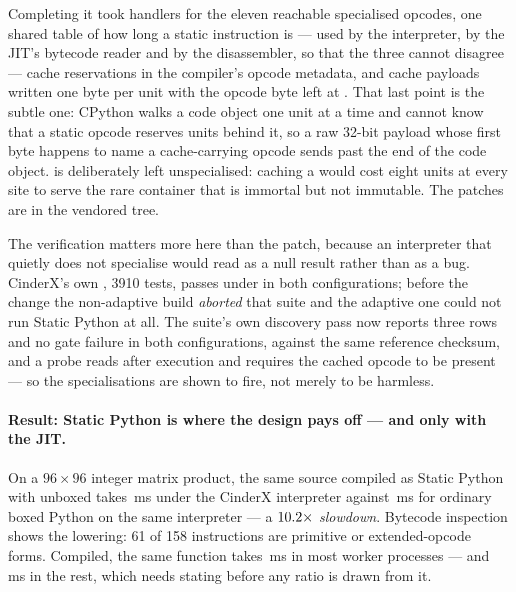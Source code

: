 Completing it took handlers for the eleven reachable specialised opcodes, one shared table of
how long a static instruction is --- used by the interpreter, by the JIT's bytecode reader and
by the disassembler, so that the three cannot disagree --- cache reservations in the compiler's
opcode metadata, and cache payloads written one byte per unit with the opcode byte left at
. That last point is the subtle one: CPython walks a code object one unit at a time
and cannot know that a static opcode reserves units behind it, so a raw 32-bit payload whose
first byte happens to name a cache-carrying opcode sends  past the end of the
code object.  is deliberately left unspecialised: caching a
 would cost eight units at every  site to serve the
rare container that is immortal but not immutable. The patches are in the vendored tree.

The verification matters more here than the patch, because an interpreter that quietly does not
specialise would read as a null result rather than as a bug. CinderX's own
, 3910 tests, passes under  in both
configurations; before the change the non-adaptive build \emph{aborted} that suite and the
adaptive one could not run Static Python at all. The suite's own discovery pass now reports
three rows and no gate failure in both configurations, against the same reference checksum, and
a probe reads  after execution and requires the cached opcode to be
present --- so the specialisations are shown to fire, not merely to be harmless.

\paragraph{Result: Static Python is where the design pays off --- and only with the JIT.}
On a $96{\times}96$ integer matrix product, the same source compiled as Static Python with
unboxed  takes \,ms under the CinderX interpreter against \,ms for
ordinary boxed Python on the same interpreter --- a $\meas{ratio:b6_static-fork_static:matmul96_int/fork_static/static_interp|b6_static-fork_static:matmul96_int/fork_static/boxed_python}{10.2}\times$ \emph{slowdown}. Bytecode
inspection shows the lowering: 61 of 158 instructions are primitive or extended-opcode forms.
Compiled, the same function takes \,ms in most worker processes --- and \,ms in the
rest, which needs stating before any ratio is drawn from it.

